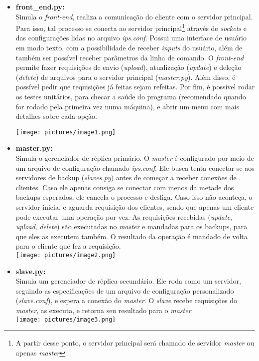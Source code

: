 \documentclass[12pt,a4paper]{article}
\begin{document}
		\begin{itemize}
			\item \textbf{front\_end.py:}\\Simula o \textit{front-end}, realiza a comunicação do cliente com o servidor principal. Para isso, tal processo se conecta ao servidor principal\footnote{A partir desse ponto, o servidor principal será chamado de servidor \textit{master} ou apenas \textit{master}} através de \textit{sockets} e das configurações lidas no arquivo \textit{ips.conf}. Possui uma interface de usuário em modo texto, com a possibilidade de receber \textit{inputs} do usuário, além de também ser possível receber parâmetros da linha de comando. O \textit{front-end} permite fazer requisições de envio (\textit{upload}), atualização (\textit{update}) e deleção (\textit{delete}) de arquivos para o servidor principal (\textit{master.py}). Além disso, é possível pedir que requisições já feitas sejam refeitas. Por fim, é possível rodar os testes unitários, para checar a saúde do programa (recomendado quando for rodado pela primeira vez numa máquina), e abrir um menu com mais detalhes sobre cada opção.
				
				\texttt{[image: pictures/image1.png]}
			
			\item \textbf{master.py:}\\Simula o gerenciador de réplica primário. O \textit{master} é configurado por meio de um arquivo de configuração chamado \textit{ips.conf}. Ele busca tenta conectar-se aos servidores de backup (\textit{slaves.py}) antes de começar a receber conexões de clientes. Caso ele apenas consiga se conectar com menos da metade dos backups esperados, ele cancela o processo e desliga. Caso isso não aconteça, o servidor inicia, e aguarda requisição dos clientes, sendo que apenas um cliente pode executar uma operação por vez. As requisições recebidas (\textit{update}, \textit{upload}, \textit{delete}) são executadas no \textit{master} e mandadas para os backups, para que eles as executem também. O resultado da operação é mandado de volta para o cliente que fez a requisição.\\
				\texttt{[image: pictures/image2.png]}
				
			\item \textbf{slave.py:}\\Simula um gerenciador de réplica secundário. Ele roda como um servidor, seguindo as especificações de um arquivo de configuração personalizado (\textit{slave.conf}), e espera a conexão do \textit{master}. O \textit{slave} recebe requisições do \textit{master}, as executa, e retorna seu resultado para o \textit{master}.\\
				\texttt{[image: pictures/image3.png]}
		\end{itemize}
	
\end{document}
